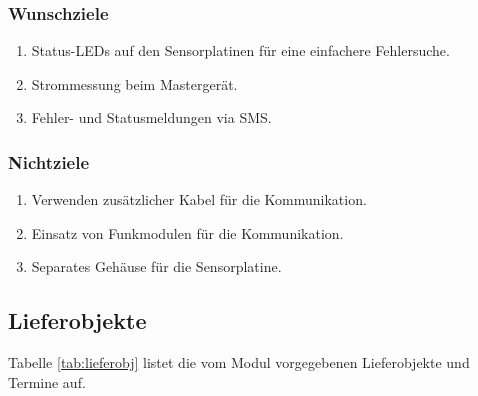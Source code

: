 \subsubsection{Wunschziele}

\begin{enumerate}
    \item
        Status-LEDs auf den Sensorplatinen f\"ur eine einfachere Fehlersuche.
    \item
        Strommessung beim Masterger\"at.
    \item
        Fehler- und Statusmeldungen via SMS.
\end{enumerate}


\subsubsection{Nichtziele}

\begin{enumerate}
    \item
        Verwenden zus\"atzlicher Kabel f\"ur die Kommunikation.
    \item
        Einsatz von Funkmodulen f\"ur die Kommunikation.
    \item
        Separates Geh\"ause f\"ur die Sensorplatine.
\end{enumerate}

\subsection{Lieferobjekte}

Tabelle \ref{tab:lieferobj}  listet die  vom Modul  vorgegebenen Lieferobjekte
und Termine auf.

